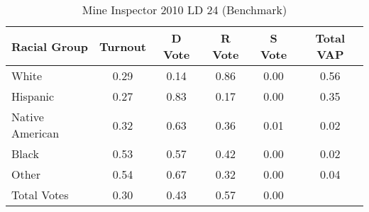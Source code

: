 \begin{table}[htb]
\begin{center}
\caption{Mine Inspector 2010 LD 24 (Benchmark)}
\label{smine_vap_ld_24_benchmark}
\begin{tabular}{lccccc}
  \hline
Racial Group & Turnout & D Vote & R Vote & S Vote & Total VAP \\ 
  \hline
White & 0.29 & 0.14 & 0.86 & 0.00 & 0.56 \\ 
  Hispanic & 0.27 & 0.83 & 0.17 & 0.00 & 0.35 \\ 
  Native American & 0.32 & 0.63 & 0.36 & 0.01 & 0.02 \\ 
  Black & 0.53 & 0.57 & 0.42 & 0.00 & 0.02 \\ 
  Other & 0.54 & 0.67 & 0.32 & 0.00 & 0.04 \\ 
  Total Votes & 0.30 & 0.43 & 0.57 & 0.00 &  \\ 
   \hline
\end{tabular}
\end{center}
\end{table}
